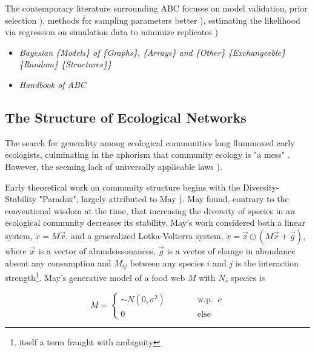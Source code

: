 \documentclass[]{article}
\begin{document}
The contemporary literature surrounding ABC focuses on model validation,
prior selection \citep{jacobs_unified_2014}), methods for sampling
parameters better \citep{beaumont_adaptive_2009}), estimating the
likelihood via regression on simulation data to minimize replicates
\citep{beaumont_approximate_2019})

\begin{itemize}
\item
  \emph{Bayesian \{Models\} of \{Graphs\}, \{Arrays\} and \{Other\}
  \{Exchangeable\} \{Random\} \{Structures\}\}}
  \citep{orbanz_bayesian_2015}
\item
  \emph{Handbook of ABC} \citep{sisson_handbook_2018}
\end{itemize}


\hypertarget{the-structure-of-ecological-networks}{%
\subsection{The Structure of Ecological
Networks}\label{the-structure-of-ecological-networks}}

The search for generality among ecological communities long flummoxed
early ecologists, culminating in the aphorism that community ecology is
"a mess" \citep{lawton_1999, simberloff_2004}. However, the seeming lack of universally applicable laws  \citep{vellend_conceptual_2010}).

Early theoretical work on community structure begins with the
Diversity-Stability "Paradox", largely attributed to May \citep{may_will_1972,may_stability_2001}). May found, contrary
to the conventional wisdom at the time, that increasing the diversity of
species in an ecological community decreases its stability. May's work
considered both a linear system, \(\dot{x} = M\vec{x}\), and a
generalized Lotka-Volterra system,
\(\dot{x} = \vec{x} \odot (M \vec{x} + \vec{g})\), where \(\vec{x}\) is
a vector of abundsissonances, \(\vec{g}\) is a vector of change in abundance
absent any consumption and \(M_{ij}\) between any species \(i\) and
\(j\) is the interaction strength\footnote{itself a term fraught with
  ambiguity}. May's generative model of a food web \(M\) with \(N_s\)
species is

\[M = \begin{cases}\sim N(0, \sigma^2) \quad\quad\quad &\text{w.p. }\ c\\ 0 &\text{else}\end{cases}\]
\end{document}
